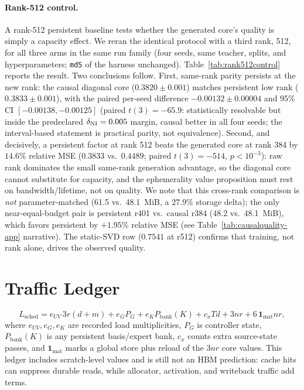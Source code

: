 \paragraph{Rank-512 control.}
A rank-512 persistent baseline tests whether the
generated core's quality is simply a capacity effect.  We reran the identical
protocol with a third rank, 512, for all three arms in the same run family
(four seeds, same teacher, splits, and hyperparameters; \texttt{md5} of the
harness unchanged).
Table~\ref{tab:rank512control} reports the result. Two conclusions follow.
First, same-rank parity persists at the new rank: the causal diagonal core
($0.3820\pm0.001$) matches persistent low rank ($0.3833\pm0.001$), with the
paired per-seed difference $-0.00132\pm0.00004$ and 95\% CI
$[-0.00138,-0.00125]$ (paired $t(3){=}-65.9$: statistically resolvable but
inside the predeclared $\delta_{\rm NI}=0.005$ margin, causal better in all
four seeds; the interval-based statement is practical parity, not
equivalence). Second,
and decisively, a persistent factor at rank 512 beats the generated core at
rank 384 by $14.6\%$ relative MSE ($0.3833$ vs.\ $0.4489$; paired
$t(3){=}-514$, $p{<}10^{-3}$): raw rank dominates the small same-rank
generation advantage, so the diagonal core cannot substitute for capacity,
and the ephemerality value proposition must rest on bandwidth/lifetime, not
on quality. We note that this cross-rank comparison is \emph{not}
parameter-matched (61.5 vs.\ 48.1~MiB, a $27.9\%$ storage delta); the only
near-equal-budget pair is persistent r401 vs.\ causal r384 (48.2 vs.\
48.1~MiB), which favors persistent by $+1.95\%$ relative MSE (see
Table~\ref{tab:causalquality-app} narrative). The static-SVD row ($0.7541$
at r512) confirms that training, not rank alone, drives the observed
quality.



\section{Traffic Ledger}
\label{app:ledger}

\begin{equation}
L_{\mathrm{sched}}=
e_{UV}\,3r(d+m)+e_G P_G+e_K P_{\mathrm{bank}}(K)
+c_xTd+3nr+6\,\mathbf 1_{\mathrm{mat}}nr,
\label{eq:traffic-ledger}
\end{equation}
where $e_{UV},e_G,e_K$ are recorded load multiplicities, $P_G$ is controller
state, $P_{\mathrm{bank}}(K)$ is any persistent basis/expert bank,
$c_x$ counts extra source-state passes, and $\mathbf 1_{\mathrm{mat}}$ marks a
global store plus reload of the $3nr$ core values. This ledger includes
scratch-level values and is still not an HBM prediction: cache hits can suppress
durable reads, while allocator, activation, and writeback traffic add terms.

